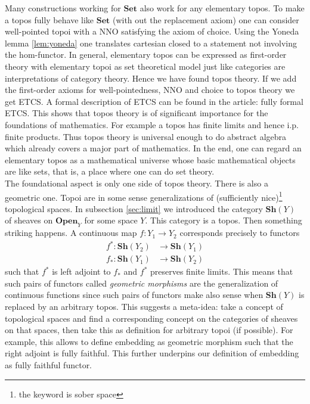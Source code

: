 Many constructions working for $\mathbf{Set}$ also work for any elementary topos. To make a topos fully behave like $\mathbf{Set}$ (with out the replacement axiom) one can consider well-pointed topoi with a NNO satisfying the axiom of choice. Using the Yoneda lemma \ref{lem:yoneda} one translates cartesian closed to a statement not involving the hom-functor. In general, elementary topos can be expressed as first-order theory with elementary topoi as set theoretical model just like categories are interpretations of category theory. Hence we have found topos theory. If we add the first-order axioms for well-pointedness, NNO and choice to topos theory we get ETCS. A formal description of ETCS can be found in the \cite{wiki-nlab0000} article: fully formal ETCS. This shows that topos theory is of significant importance for the foundations of mathematics. For example a topos has finite limits and hence i.p. finite products. Thus topos theory is universal enough to do abstract algebra which already covers a major part of mathematics. In the end, one can regard an elementary topos as a mathematical universe whose basic mathematical objects are like sets, that is, a place where one can do set theory.
\\
The foundational aspect is only one side of topos theory. There is also a geometric one. Topoi are in some sense generalizations of (sufficiently nice)\footnote{the keyword is sober space} topological spaces. In subsection \ref{sec:limit} we introduced the category $\mathbf{Sh}(Y)$ of sheaves on $\mathbf{Open}_{Y}$ for some space $Y$. This category is a topos. Then something striking happens. A continuous map $f \colon Y_{1} \rightarrow Y_{2}$ corresponds precisely to functors
\begin{align*}
  f^{\ast}
  \colon
  \mathbf{Sh}(Y_{2})
  &\rightarrow
  \mathbf{Sh}(Y_{1})
  \\
  f_{\ast}
  \colon
  \mathbf{Sh}(Y_{1})
  &\rightarrow
  \mathbf{Sh}(Y_{2})
\end{align*}
such that $f^{\ast}$ is left adjoint to $f_{\ast}$ and $f^{\ast}$ preserves finite limits. This means that such pairs of functors called \textit{geometric morphisms} are the generalization of continuous functions since such pairs of functors make also sense when $\mathbf{Sh}(Y)$ is replaced by an arbitrary topos. This suggests a meta-idea: take a concept of topological spaces and find a corresponding concept on the categories of sheaves on that spaces, then take this as definition for arbitrary topoi (if possible). For example, this allows to define embedding as geometric morphism such that the right adjoint is fully faithful. This further underpins our definition of embedding as fully faithful functor.
